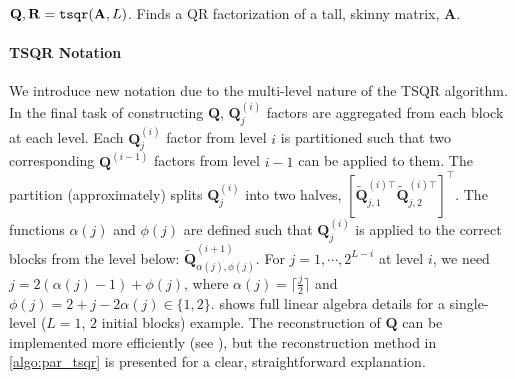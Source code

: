 \documentclass[review,onefignum,onetabnum]{siamart190516}
\newcommand{\bb}[1]{\mathbf{#1}}
\begin{document}
\begin{algorithm2e}[H]
{\begin{bmatrix}
		\end{bmatrix}\)
		}
	\Return{$\bb{Q}$, $\bb{R}$}
	\caption{$\bb{Q},\bb{R}={\tt tsqr}(\bb{A}, L)$.  Finds a QR factorization of a tall, skinny matrix, $\bb{A}$. }
	\label{algo:par_tsqr}
\end{algorithm2e}
\paragraph{TSQR Notation}
We introduce new notation due to the multi-level nature of the TSQR algorithm.
In the final task of constructing $\bb{Q}$, $\bb{Q}_j^{(i)}$ factors are aggregated from each block at each level.
Each $\bb{Q}_j^{(i)}$ factor from level $i$ is partitioned such that two corresponding $\bb{Q}^{(i-1)}$ factors from level $i-1$ can be applied to them. 
The partition (approximately) splits $\bb{Q}_{j}^{(i)}$ into two halves, $[\tilde{\bb{Q}}_{j, 1}^{(i)\top} \tilde{\bb{Q}}_{j, 2}^{(i)\top}]^{\top}$.
The functions $\alpha(j)$ and $\phi(j)$ are defined such that $\bb{Q}_j^{(i)}$ is applied to the correct blocks from the level below: $\tilde{\bb{Q}}_{\alpha(j), \phi(j)}^{(i+1)}$.
For $j = 1 , \cdots, 2^{L-i}$ at level $i$, we need $j = 2(\alpha(j)-1) + \phi(j)$, where $\alpha(j) = \lceil \frac{j}{2}\rceil$ and $\phi(j) = 2 + j - 2\alpha(j) \in\{1,2\}$.
 shows full linear algebra details for a single-level ($L=1$, $2$ initial blocks) example.
The reconstruction of $\bb{Q}$ can be implemented more efficiently (see \cite{BDGJNS2014}), but the reconstruction method in \cref{algo:par_tsqr} is presented for a clear, straightforward explanation.
\end{document}
